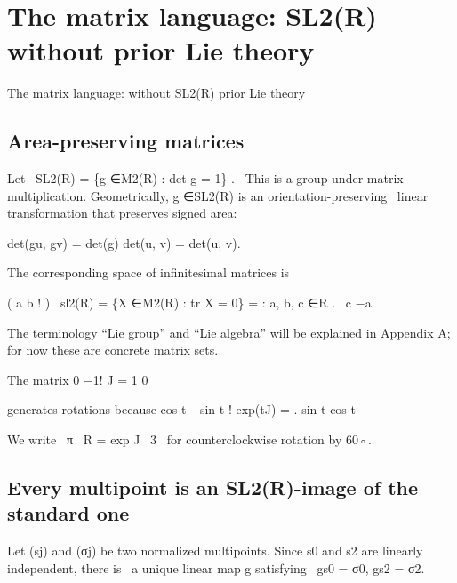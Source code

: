 \chapter{The matrix language: SL2(R) without prior Lie theory}
The matrix language: without SL2(R) prior Lie theory


\section{Area-preserving matrices}

\begin{displaytext}
Let \
SL2(R) = \{g ∈M2(R) : det g = 1\} . \
This is a group under matrix multiplication. Geometrically, g ∈SL2(R) is an orientation-preserving \
linear transformation that preserves signed area:
\end{displaytext}

\begin{displaytext}
det(gu, gv) = det(g) det(u, v) = det(u, v).
\end{displaytext}

The corresponding space of infinitesimal matrices is


\begin{displaytext}
( a b ! ) \
sl2(R) = \{X ∈M2(R) : tr X = 0\} = : a, b, c ∈R . \
c −a
\end{displaytext}

The terminology “Lie group” and “Lie algebra” will be explained in Appendix A; for now these are concrete matrix sets.


The matrix 0 −1! J = 1 0


generates rotations because cos t −sin t ! exp(tJ) = . sin t cos t


\begin{displaytext}
We write \
π \
R = exp J \
3 \
for counterclockwise rotation by 60◦.
\end{displaytext}

\section{Every multipoint is an SL2(R)-image of the standard one}

\begin{displaytext}
Let (sj) and (σj) be two normalized multipoints. Since s0 and s2 are linearly independent, there is \
a unique linear map g satisfying \
gs0 = σ0, gs2 = σ2.
\end{displaytext}

